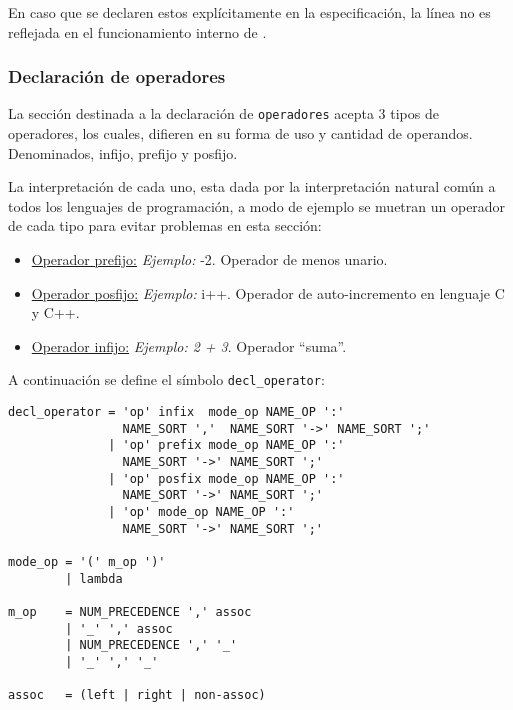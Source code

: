 En caso que se declaren estos explícitamente en la especificación, la línea no es reflejada en el funcionamiento interno de \maggen.

\subsubsection{Declaración de operadores}
La sección destinada a la declaración de \texttt{operadores} acepta 3 tipos de operadores, los cuales, difieren en su forma de uso y cantidad de operandos. Denominados, infijo, prefijo y posfijo. 

La interpretación de cada uno, esta dada por la interpretación natural común a todos los lenguajes de programación, a modo de ejemplo se muetran un operador de cada tipo para evitar problemas en esta sección:

\begin{itemize}
\item \underline{Operador prefijo:} \textit{Ejemplo:} -2. Operador de menos unario. 

\item \underline{Operador posfijo:} \textit{Ejemplo:} i++. Operador de auto-incremento en lenguaje C y C++.

\item \underline{Operador infijo:} \textit{Ejemplo: 2 + 3}. Operador ``suma''.
\end{itemize}

A continuación se define el símbolo \texttt{decl\_operator}:

\begin{center}
\lstset{language=inform}
\begin{lstlisting}
decl_operator = 'op' infix  mode_op NAME_OP ':'
                NAME_SORT ','  NAME_SORT '->' NAME_SORT ';' 
              | 'op' prefix mode_op NAME_OP ':'
                NAME_SORT '->' NAME_SORT ';'               
              | 'op' posfix mode_op NAME_OP ':'
                NAME_SORT '->' NAME_SORT ';'
              | 'op' mode_op NAME_OP ':'
                NAME_SORT '->' NAME_SORT ';'

mode_op = '(' m_op ')'
        | lambda

m_op    = NUM_PRECEDENCE ',' assoc
        | '_' ',' assoc
        | NUM_PRECEDENCE ',' '_'
        | '_' ',' '_'

assoc   = (left | right | non-assoc) 
\end{lstlisting}
\end{center}

